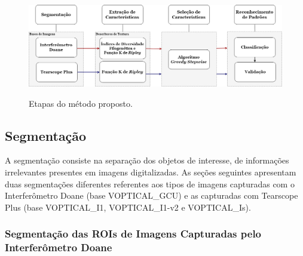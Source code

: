 \begin{figure}[ht!]
    \centering
    \caption{Etapas do método proposto.}
    \includegraphics[width=15.8cm]{figs/metodoDissertacao2.png}
    \label{fig:metodoProposto}
\end{figure}

\subsection{Segmentação}
\label{sec:metodoSegmentacao}


A segmentação consiste na separação dos objetos de interesse, de informações irrelevantes presentes em imagens digitalizadas. As seções seguintes apresentam duas segmentações diferentes referentes aos tipos de imagens capturadas com o Interferômetro Doane (base VOPTICAL\_GCU) e as capturadas com Tearscope Plus (base VOPTICAL\_I1, VOPTICAL\_I1-v2 e VOPTICAL\_Is).



\subsubsection{Segmentação das ROIs de Imagens Capturadas pelo Interferômetro Doane}
\label{sec:metodoSegInterferometroDoane}

